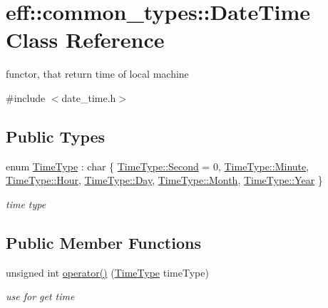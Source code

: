\hypertarget{classeff_1_1common__types_1_1DateTime}{}\section{eff\+:\+:common\+\_\+types\+:\+:Date\+Time Class Reference}
\label{classeff_1_1common__types_1_1DateTime}


functor, that return time of local machine  




{\ttfamily \#include $<$date\+\_\+time.\+h$>$}

\subsection*{Public Types}
\begin{DoxyCompactItemize}
\item 
enum \hyperlink{classeff_1_1common__types_1_1DateTime_a7c7c7290ee7be89bae66e68d24c68d09}{Time\+Type} \+: char \{ \newline
\hyperlink{classeff_1_1common__types_1_1DateTime_a7c7c7290ee7be89bae66e68d24c68d09ac22cf8376b1893dcfcef0649fe1a7d87}{Time\+Type\+::\+Second} = 0, 
\hyperlink{classeff_1_1common__types_1_1DateTime_a7c7c7290ee7be89bae66e68d24c68d09a62902641c38f3a4a8eb3212454360e24}{Time\+Type\+::\+Minute}, 
\hyperlink{classeff_1_1common__types_1_1DateTime_a7c7c7290ee7be89bae66e68d24c68d09ab55e509c697e4cca0e1d160a7806698f}{Time\+Type\+::\+Hour}, 
\hyperlink{classeff_1_1common__types_1_1DateTime_a7c7c7290ee7be89bae66e68d24c68d09a03727ac48595a24daed975559c944a44}{Time\+Type\+::\+Day}, 
\newline
\hyperlink{classeff_1_1common__types_1_1DateTime_a7c7c7290ee7be89bae66e68d24c68d09a7cbb885aa1164b390a0bc050a64e1812}{Time\+Type\+::\+Month}, 
\hyperlink{classeff_1_1common__types_1_1DateTime_a7c7c7290ee7be89bae66e68d24c68d09a537c66b24ef5c83b7382cdc3f34885f2}{Time\+Type\+::\+Year}
 \}\begin{DoxyCompactList}\small\item\em time type \end{DoxyCompactList}
\end{DoxyCompactItemize}
\subsection*{Public Member Functions}
\begin{DoxyCompactItemize}
\item 
unsigned int \hyperlink{classeff_1_1common__types_1_1DateTime_ab9bcf70b86eb6d080bcef37fb1586ea8}{operator()} (\hyperlink{classeff_1_1common__types_1_1DateTime_a7c7c7290ee7be89bae66e68d24c68d09}{Time\+Type} time\+Type)
\begin{DoxyCompactList}\small\item\em use for get time \end{DoxyCompactList}\end{DoxyCompactItemize}
